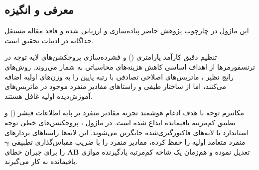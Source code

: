 \subsection{معرفی و انگیزه}
این ماژول در چارچوب پژوهش حاضر پیاده‌سازی و ارزیابی شده و فاقد مقاله مستقل جداگانه در ادبیات تحقیق است.

تنظیم دقیق کارآمد پارامتری () و فشرده‌سازی پروجکشن‌های لایه توجه در ترنسفورمرها از اهداف اساسی کاهش هزینه‌های محاسباتی به شمار می‌روند. روش‌های رایج نظیر ، ماتریس‌های اصلاحی تصادفی با رتبه پایین را به وزن‌های اولیه اضافه می‌کنند، اما از ساختار طیفی و راستاهای مقادیر منفرد موجود در ماتریس‌های آموزش‌دیده اولیه غافل هستند.

مکانیزم توجه  با هدف ادغام هوشمند تجزیه مقادیر منفرد بر پایه اطلاعات فیشر () و تطبیق کم‌مرتبه باقیمانده ابداع شده است. در ماژول ، پروجکشن‌های خطی توجه استاندارد با لایه‌های فاکتورگیری‌شده  جایگزین می‌شوند. این لایه‌ها راستاهای بردارهای منفرد متعامد اولیه را حفظ کرده، مقادیر منفرد را با ضریب مقیاس‌گذاری تطبیقی $\boldsymbol{\gamma}$ تعدیل نموده و هم‌زمان یک شاخه کم‌مرتبه یادگیرنده موازی $\mathbf{A} \mathbf{B}$ را برای جبران خطای باقیمانده به کار می‌گیرند.
